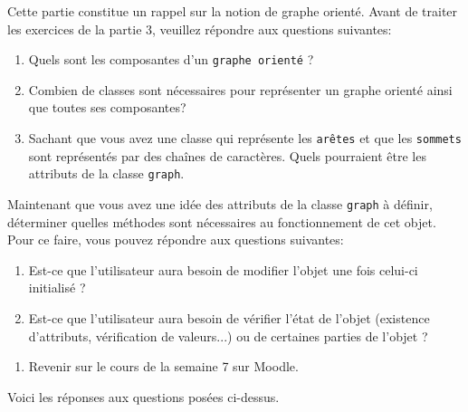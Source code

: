 
Cette partie constitue un rappel sur la notion de graphe orienté. Avant de traiter les exercices de la partie 3, veuillez répondre aux questions suivantes:
    \begin{enumerate}
        \item Quels sont les composantes d'un \lstinline{graphe orienté} ?
        \item Combien de classes sont nécessaires pour représenter un graphe orienté ainsi que toutes ses composantes?
        \item Sachant que vous avez une classe qui représente les \lstinline{arêtes} et que les \lstinline{sommets} sont représentés par des chaînes de caractères. Quels pourraient être les attributs de la classe \lstinline{graph}.
    \end{enumerate}

Maintenant que vous avez une idée des attributs de la classe \lstinline{graph} à définir, déterminer quelles méthodes sont nécessaires au fonctionnement de cet objet. Pour ce faire, vous pouvez répondre aux questions suivantes:
    \begin{enumerate}
    \item Est-ce que l'utilisateur aura besoin de modifier l'objet une fois celui-ci initialisé ?
    \item Est-ce que l'utilisateur aura besoin de vérifier l'état de l'objet (existence d'attributs, vérification de valeurs...) ou de certaines parties de l'objet ?
    \end{enumerate}

\begin{conseil}
   \begin{enumerate}
   \item Revenir sur le cours de la semaine 7 sur Moodle.
   \end{enumerate}
\end{conseil}
    
Voici les réponses aux questions posées ci-dessus. 

